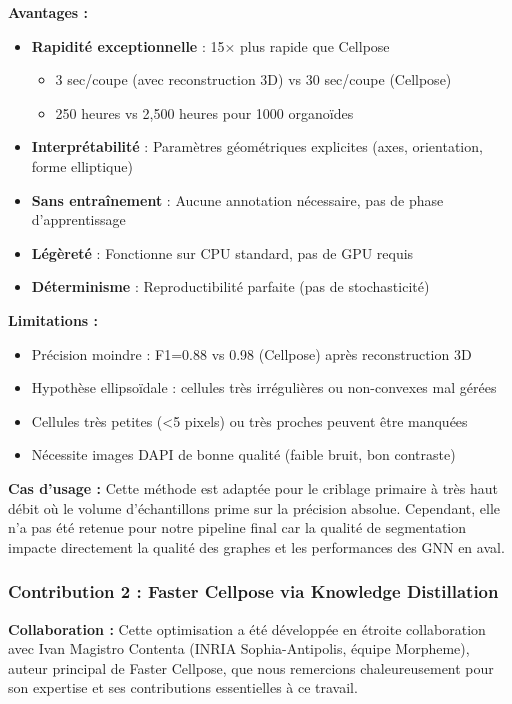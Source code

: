\textbf{Avantages :}
\begin{itemize}
    \item \textbf{Rapidité exceptionnelle} : 15× plus rapide que Cellpose
    \begin{itemize}
        \item 3 sec/coupe (avec reconstruction 3D) vs 30 sec/coupe (Cellpose)
        \item 250 heures vs 2,500 heures pour 1000 organoïdes
    \end{itemize}
    \item \textbf{Interprétabilité} : Paramètres géométriques explicites (axes, orientation, forme elliptique)
    \item \textbf{Sans entraînement} : Aucune annotation nécessaire, pas de phase d'apprentissage
    \item \textbf{Légèreté} : Fonctionne sur CPU standard, pas de GPU requis
    \item \textbf{Déterminisme} : Reproductibilité parfaite (pas de stochasticité)
\end{itemize}

\textbf{Limitations :}
\begin{itemize}
    \item Précision moindre : F1=0.88 vs 0.98 (Cellpose) après reconstruction 3D
    \item Hypothèse ellipsoïdale : cellules très irrégulières ou non-convexes mal gérées
    \item Cellules très petites (<5 pixels) ou très proches peuvent être manquées
    \item Nécessite images DAPI de bonne qualité (faible bruit, bon contraste)
\end{itemize}

\textbf{Cas d'usage :}
Cette méthode est adaptée pour le criblage primaire à très haut débit où le volume d'échantillons prime sur la précision absolue. Cependant, elle n'a pas été retenue pour notre pipeline final car la qualité de segmentation impacte directement la qualité des graphes et les performances des GNN en aval.

\subsubsection{Contribution 2 : Faster Cellpose via Knowledge Distillation}

\textbf{Collaboration :}
Cette optimisation a été développée en étroite collaboration avec Ivan Magistro Contenta (INRIA Sophia-Antipolis, équipe Morpheme), auteur principal de Faster Cellpose, que nous remercions chaleureusement pour son expertise et ses contributions essentielles à ce travail.

